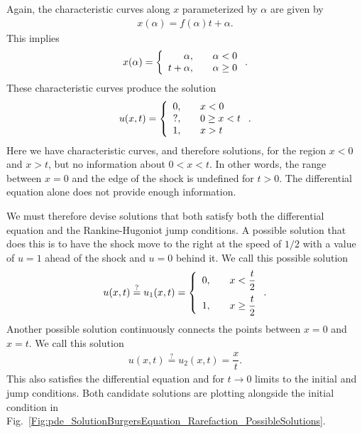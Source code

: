 Again, the characteristic curves along $x$ parameterized by $\alpha$ are given by
\begin{align}
  x(\alpha) = f(\alpha) t + \alpha . \nonumber
\end{align}
This implies
\begin{align}
  x(\alpha) = \left\{ \begin{array}{r l}
  \alpha, & \quad \alpha < 0 \\
  t + \alpha, & \quad \alpha \ge 0 \\ \end{array} \right. .
\end{align}
These characteristic curves produce the solution
\begin{align}
  u(x,t) = \left\{ \begin{array}{r l}
  0, & \quad x < 0 \\
  ?, & \quad 0 \ge x < t \\
  1, & \quad x > t \\ \end{array} \right. .
\end{align}
Here we have characteristic curves, and therefore solutions, for the region $x < 0$ and $x > t$, but no information about $0 < x < t$. In other words, the range between $x = 0$ and the edge of the shock is undefined for $t > 0$. The differential equation alone does not provide enough information.

We must therefore devise solutions that both satisfy both the differential equation and the Rankine-Hugoniot jump conditions. A possible solution that does this is to have the shock move to the right at the speed of $1/2$ with a value of $u = 1$ ahead of the shock and $u = 0$ behind it. We call this possible solution
\begin{align}
  u(x,t) \stackrel{?}{=} u_1(x,t) = \left\{ \begin{array}{r l}
  0, & \quad x < \dfrac{t}{2} \vspace{0.2cm} \\
  1, & \quad x \ge \dfrac{t}{2} \\ \end{array} \right. .
\end{align}
Another possible solution continuously connects the points between $x = 0$ and $x = t$. We call this solution
\begin{align}
  u(x,t) \stackrel{?}{=} u_2(x,t) = \dfrac{x}{t} .
\end{align}
This also satisfies the differential equation and for $t \rightarrow 0$ limits to the initial and jump conditions. Both candidate solutions are plotting alongside the initial condition in Fig.~\ref{Fig:pde_SolutionBurgersEquation_Rarefaction_PossibleSolutions}.

